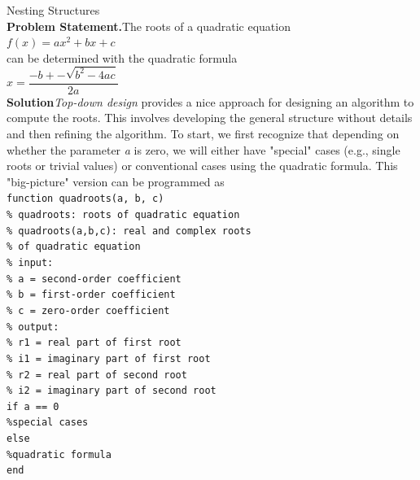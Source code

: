 \documentclass[../main.tex]{subfiles}
\begin{document}
\begin{example} Nesting Structures\\
    \noindent\textbf{Problem Statement.}\quad The roots of a quadratic equation\\

    $f(x) = ax^2 + bx + c$\\

    \noindent can be determined with the quadratic formula\\

    $x = \dfrac{-b +- \sqrt{b^2 - 4ac}}{2a}$\\

    \noindent\textbf{Solution}\quad \emph{Top-down design} provides a nice approach for designing an algorithm to compute
    the roots. This involves developing the general structure without details and then
    refining the algorithm. To start, we first recognize that depending on whether the parameter
    \emph{a} is zero, we will either have "special" cases (e.g., single roots or trivial values) or conventional
    cases using the quadratic formula. This "big-picture" version can be programmed as\\

    \texttt{function quadroots(a, b, c)\\
    \indent \% quadroots: roots of quadratic equation\\
    \indent \% \hspace{2mm} quadroots(a,b,c): real and complex roots\\
    \indent \% \indent\indent of quadratic equation\\
    \indent \% input:\\
    \indent \% \hspace{2mm} a = second-order coefficient\\
    \indent \% \hspace{2mm} b = first-order coefficient\\
    \indent \% \hspace{2mm} c = zero-order coefficient\\
    \indent \% output:\\
    \indent \% \hspace{2mm} r1 = real part of first root\\
    \indent \% \hspace{2mm} i1 = imaginary part of first root\\
    \indent \% \hspace{2mm} r2 = real part of second root\\
    \indent \% \hspace{2mm} i2 = imaginary part of second root\\
    \indent if a == 0\\
    \indent\hspace{2mm} \%special cases\\
    \indent else\\
    \indent\hspace{2mm} \%quadratic formula\\
    \indent end
    }\\


\end{example}
\end{document}

